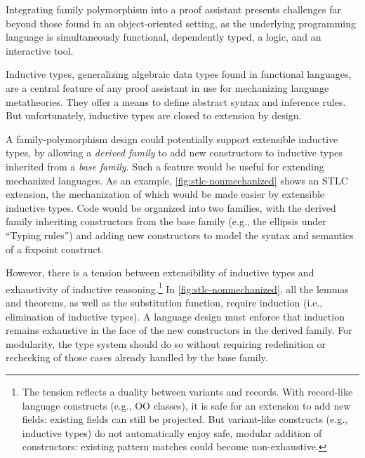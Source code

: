 Integrating family polymorphism into a proof assistant presents challenges
far beyond those found in an object-oriented setting, %
as the underlying programming language is simultaneously
functional, dependently typed, a logic, and an interactive tool.


Inductive types, generalizing algebraic data types found in
functional languages, are a central feature of any proof assistant
in use for mechanizing language metatheories.
They offer a means to define abstract syntax and inference rules.
But unfortunately, inductive types are closed to extension by design.

A family-polymorphism design could potentially support extensible
inductive types, by allowing a \emph{derived family} to add new constructors
to inductive types inherited from a \emph{base family}.
Such a feature would be useful for extending mechanized languages.
As an example, \cref{fig:stlc-nonmechanized} shows an STLC extension,
the mechanization of which would be made easier by extensible inductive types.
Code would be organized into two families, with the
derived family inheriting constructors from the base family (e.g., the
ellipsis under ``Typing rules'') and adding new constructors to model
the syntax and semantics of a fixpoint construct.



However, there is a tension between extensibility of inductive types
and exhaustivity of inductive reasoning.\footnote{%
The tension reflects a duality between variants and records.
With record-like language constructs (e.g., OO classes),
it is safe for an extension to add new fields:
existing fields can still be projected.
But variant-like constructs (e.g., inductive types) do not automatically
enjoy safe, modular addition of constructors:
existing pattern matches could become non-exhaustive.}
In \cref{fig:stlc-nonmechanized}, all the lemmas and theorems, as well as
the substitution function, require induction (i.e., elimination of inductive types).
A language design must enforce that induction remains exhaustive in the
face of the new constructors in the derived family.
For modularity, the type system should do so without requiring
redefinition or rechecking of those cases already handled by the base
family.


